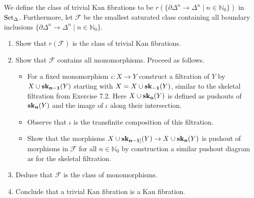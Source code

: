 \begin{Exercise}
    
We define the class of trivial Kan fibrations to be $ r ( \{ \partial \Delta^n \to \Delta^n \mid n \in \mathbb{ N }_0 \} ) $ in $ \operatorname{Set}_{\Delta} $.
Furthermore, let $ \mathcal{ F } $ be the smallest saturated class containing all boundary inclusions $ \{ \partial \Delta^n \to \Delta^n \mid n \in \mathbb{ N }_0 \} $.

\begin{enumerate}[label=(\alph*)]
    \item 
    Show that $ r ( \mathcal{ F } ) $ is the class of trivial Kan fibrations.

    \item 
    Show that $ \mathcal{ F } $ contains all monomorphisms. Proceed as follows.

    \begin{itemize}
        \item 
        For a fixed monomorphism $ \iota : X \to Y $ construct a filtration of $ Y $ by $ X \cup \bold{sk_{n-1}} ( Y ) $ starting with $ X = X \cup \bold{sk_{-1}}( Y ) $, similar to the skeletal filtration from Exercise 7.2. 
        Here $ X \cup \bold{sk_n} ( Y ) $ is defined as pushouts of $ \bold{ sk_n } ( Y ) $ and the image of $ \iota $ along their intersection.

        \item 
        Observe that $ \iota $ is the transfinite composition of this filtration.

        \item 
        Show that the morphisms $ X \cup \bold{sk_{n-1]}}( Y ) \to X \cup \bold{ sk_n }( Y ) $ is pushout of morphisms in $ \mathcal{ F } $ for all $ n \in \mathbb{ N }_0 $ by construction a similar pushout diagram as for the skeletal filtration.
    \end{itemize}

    \item 
    Deduce that $\mathcal{ F }$ is the class of monomorphisms.

    \item 
    Conclude that a trivial Kan fibration is a Kan fibration.
    
\end{enumerate}

\end{Exercise}

